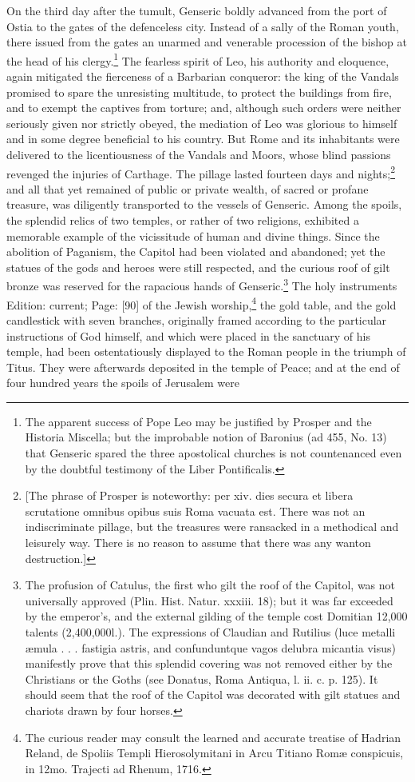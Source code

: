 On the third day after the tumult, Genseric boldly advanced from the port of Ostia to the gates of the defenceless city. Instead of a sally of the Roman youth, there issued from the gates an unarmed and venerable procession of the bishop at the head of his clergy.\footnote{The apparent success of Pope Leo may be justified by Prosper and the Historia Miscella; but the improbable notion of Baronius (ad 455, No. 13) that Genseric spared the three apostolical churches is not countenanced even by the doubtful testimony of the Liber Pontificalis.} The fearless spirit of Leo, his authority and eloquence, again mitigated the fierceness of a Barbarian conqueror: the king of the Vandals promised to spare the unresisting multitude, to protect the buildings from fire, and to exempt the captives from torture; and, although such orders were neither seriously given nor strictly obeyed, the mediation of Leo was glorious to himself and in some degree beneficial to his country. But Rome and its inhabitants were delivered to the licentiousness of the Vandals and Moors, whose blind passions revenged the injuries of Carthage. The pillage lasted fourteen days and nights;\footnote{[The phrase of Prosper is noteworthy: per xiv. dies secura et libera scrutatione omnibus opibus suis Roma vacuata est. There was not an indiscriminate pillage, but the treasures were ransacked in a methodical and leisurely way. There is no reason to assume that there was any wanton destruction.]} and all that yet remained of public or private wealth, of sacred or profane treasure, was diligently transported to the vessels of Genseric. Among the spoils, the splendid relics of two temples, or rather of two religions, exhibited a memorable example of the vicissitude of human and divine things. Since the abolition of Paganism, the Capitol had been violated and abandoned; yet the statues of the gods and heroes were still respected, and the curious roof of gilt bronze was reserved for the rapacious hands of Genseric.\footnote{The profusion of Catulus, the first who gilt the roof of the Capitol, was not universally approved (Plin. Hist. Natur. xxxiii. 18); but it was far exceeded by the emperor\texthebrew{}’s, and the external gilding of the temple cost Domitian 12,000 talents (2,400,000l.). The expressions of Claudian and Rutilius (luce metalli æmula . . . fastigia astris, and confunduntque vagos delubra micantia visus) manifestly prove that this splendid covering was not removed either by the Christians or the Goths (see Donatus, Roma Antiqua, l. ii. c. p. 125). It should seem that the roof of the Capitol was decorated with gilt statues and chariots drawn by four horses.} The holy instruments Edition: current; Page: [90] of the Jewish worship,\footnote{The curious reader may consult the learned and accurate treatise of Hadrian Reland, de Spoliis Templi Hierosolymitani in Arcu Titiano Romæ conspicuis, in 12mo. Trajecti ad Rhenum, 1716.} the gold table, and the gold candlestick with seven branches, originally framed according to the particular instructions of God himself, and which were placed in the sanctuary of his temple, had been ostentatiously displayed to the Roman people in the triumph of Titus. They were afterwards deposited in the temple of Peace; and at the end of four hundred years the spoils of Jerusalem were 